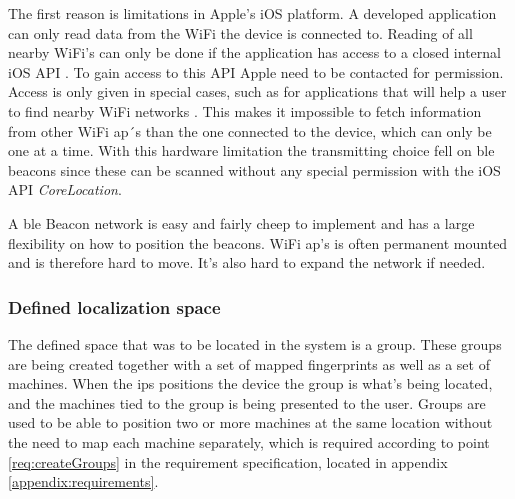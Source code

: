\bigskip

The first reason is limitations in Apple's iOS platform.
A developed application can only read data from the WiFi the device is connected to.
Reading of all nearby WiFi's can only be done if the application has access to a closed internal iOS API \cite{NEHotspotHelperAppleDeveloper}.
To gain access to this API Apple need to be contacted for permission.
Access is only given in special cases, such as for applications that will help a user to find nearby WiFi networks \cite{TechnicalQA1942IOS}.
This makes it impossible to fetch information from other WiFi \acrshort{ap}´s than the one connected to the device, which can only be one at a time.
With this hardware limitation the transmitting choice fell on \acrshort{ble} beacons since these can be scanned without any special permission with the iOS API \textit{CoreLocation}.

\bigskip

A \acrshort{ble} Beacon network is easy and fairly cheep to implement and has a large flexibility on how to position the beacons.
WiFi \acrshort{ap}'s is often permanent mounted and is therefore hard to move.
It's also hard to expand the network if needed.


\subsubsection{Defined localization space}\label{sec:methodSoftwareDesignDefinedSpace} The defined space that was to be located in the system is a group.
These groups are being created together with a set of mapped fingerprints as well as a set of machines.
When the \acrshort{ips} positions the device the group is what's being located, and the machines tied to the group is being presented to the user.
Groups are used to be able to position two or more machines at the same location without the need to map each machine separately, which is required according to point \ref{req:createGroups} in the requirement specification, located in appendix \ref{appendix:requirements}.
